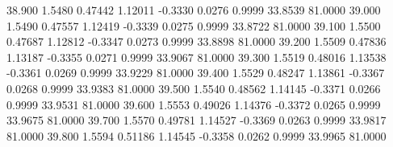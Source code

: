   38.900   1.5480   0.47442   1.12011  -0.3330   0.0276   0.9999  33.8539  81.0000
  39.000   1.5490   0.47557   1.12419  -0.3339   0.0275   0.9999  33.8722  81.0000
  39.100   1.5500   0.47687   1.12812  -0.3347   0.0273   0.9999  33.8898  81.0000
  39.200   1.5509   0.47836   1.13187  -0.3355   0.0271   0.9999  33.9067  81.0000
  39.300   1.5519   0.48016   1.13538  -0.3361   0.0269   0.9999  33.9229  81.0000
  39.400   1.5529   0.48247   1.13861  -0.3367   0.0268   0.9999  33.9383  81.0000
  39.500   1.5540   0.48562   1.14145  -0.3371   0.0266   0.9999  33.9531  81.0000
  39.600   1.5553   0.49026   1.14376  -0.3372   0.0265   0.9999  33.9675  81.0000
  39.700   1.5570   0.49781   1.14527  -0.3369   0.0263   0.9999  33.9817  81.0000
  39.800   1.5594   0.51186   1.14545  -0.3358   0.0262   0.9999  33.9965  81.0000
